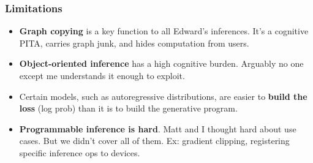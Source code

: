 \documentclass[10pt,
               xcolor={usenames,dvipsnames},
               hyperref={colorlinks,linktoc=all,citecolor=Plum,linkcolor=MidnightBlue,urlcolor=MidnightBlue},noamssymb]{beamer}
\begin{document}

\begin{frame}
\frametitle{Limitations}
\begin{itemize}
\item
\textbf{Graph copying} is a key function to all Edward's inferences. It's a
cognitive PITA, carries graph junk, and hides computation from users.
\item
\textbf{Object-oriented inference} has a high cognitive burden. Arguably no one
except me understands it enough to exploit.
\item
Certain models, such as autoregressive distributions, are easier to
\textbf{build the loss} (log prob) than it is to build the generative program.
\item
\textbf{Programmable inference is hard}. Matt and I thought hard about
use cases. But we didn't cover all of them. Ex: gradient clipping,
registering specific inference ops to devices.
\end{itemize}
\end{frame}
\end{document}
